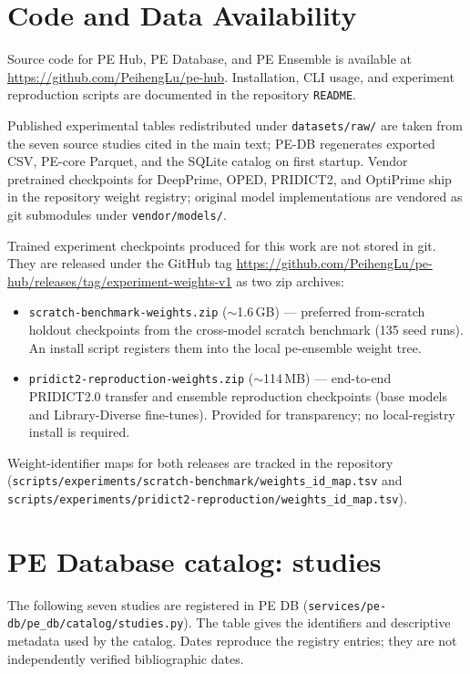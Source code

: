 \documentclass{article}
\begin{document}
\printbibliography

\clearpage
\appendix

\section{Code and Data Availability}
\label{app:code-data}

Source code for PE Hub, PE Database, and PE Ensemble is available at
\url{https://github.com/PeihengLu/pe-hub}.
Installation, CLI usage, and experiment reproduction scripts are documented in the repository \nolinkurl{README}.

Published experimental tables redistributed under \nolinkurl{datasets/raw/} are taken from the seven source studies cited in the main text; PE-DB regenerates exported CSV, PE-core Parquet, and the SQLite catalog on first startup.
Vendor pretrained checkpoints for DeepPrime, OPED, PRIDICT2, and OptiPrime ship in the repository weight registry; original model implementations are vendored as git submodules under \nolinkurl{vendor/models/}.

Trained experiment checkpoints produced for this work are not stored in git.
They are released under the GitHub tag
\url{https://github.com/PeihengLu/pe-hub/releases/tag/experiment-weights-v1}
as two zip archives:
\begin{itemize}
    \item \nolinkurl{scratch-benchmark-weights.zip} (${\sim}$1.6\,GB) --- preferred from-scratch holdout checkpoints from the cross-model scratch benchmark (135 seed runs). An install script registers them into the local pe-ensemble weight tree.
    \item \nolinkurl{pridict2-reproduction-weights.zip} (${\sim}$114\,MB) --- end-to-end PRIDICT2.0 transfer and ensemble reproduction checkpoints (base models and Library-Diverse fine-tunes). Provided for transparency; no local-registry install is required.
\end{itemize}
Weight-identifier maps for both releases are tracked in the repository
(\nolinkurl{scripts/experiments/scratch-benchmark/weights_id_map.tsv} and
\nolinkurl{scripts/experiments/pridict2-reproduction/weights_id_map.tsv}).

\section{PE Database catalog: studies}
\label{app:studies}

The following seven studies are registered in PE DB (\nolinkurl{services/pe-db/pe_db/catalog/studies.py}). The table gives the identifiers and descriptive metadata used by the catalog. Dates reproduce the registry entries; they are not independently verified bibliographic dates.
\end{document}
